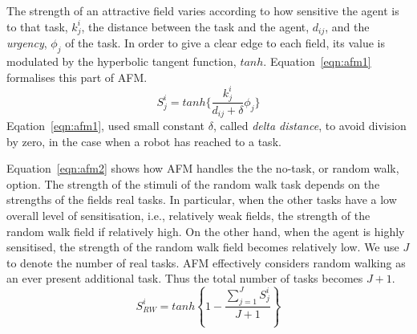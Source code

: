 \documentclass[smallcondensed]{svjour3}
\begin{document}
The strength of an attractive field varies according to how sensitive the agent is to that task, $k_{j}^{i}$, the distance between the task and the agent, $d_{ij}$, and the {\em urgency}, $\phi _{j}$ of the task.  In order to give a clear edge to each field, its value is modulated by the hyperbolic tangent function, $tanh$.  Equation~\ref{eqn:afm1} formalises this part of AFM.
\begin{equation}
S_{j}^{i} = tanh\{\frac{k_{j}^{i}}{d_{ij}+\delta } \phi _{j}\}
\label{eqn:afm1}
\end{equation}
Eqation~\ref{eqn:afm1}, used small constant $\delta$, called {\em delta distance}, to avoid division by zero, in the case when a robot has reached to a task.

Equation~\ref{eqn:afm2} shows how AFM handles the the no-task, or random walk, option.  The strength of the stimuli of the random walk task depends on the strengths of the fields real tasks.  In particular, when the other tasks have a low overall level of sensitisation, i.e., relatively weak fields, the strength of the random walk field if relatively high.  On the other hand, when the agent is highly sensitised, the strength of the random walk field becomes relatively low.  We use $J$ to denote the number of real tasks.  AFM effectively considers random walking as an ever present additional task.  Thus the total number of tasks becomes $J+1$. %
\begin{equation}
S^{i}_{RW} = tanh \left \{ 1 -  \frac{ \sum_{j=1}^{J} S^{i}_{j}}{J + 1} \right \}
\label{eqn:afm2}
\end{equation}
\end{document}
